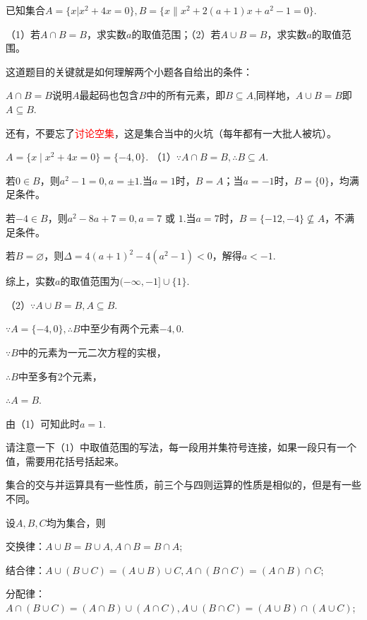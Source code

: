 \documentclass[lang=cn,math=cm,chinesefont=nofont,11pt,scheme=chinese,twocol]{elegantbook}
\begin{document}
\begin{example}
  已知集合$A=\{x|x^{2}+4x=0\},B=\{x\|x^{2}+2(a+1)x+a^{2}-1=0\}.$

  （1）若$A\cap B=B$，求实数$a$的取值范围；（2）若$A\cup B=B$，求实数$a$的取值范围。
\end{example}
\begin{remark}
  这道题目的关键就是如何理解两个小题各自给出的条件：

  $A\cap B=B$说明$A$最起码也包含$B$中的所有元素，即$B\subseteq A$,同样地，$A\cup B=B$即$A\subseteq B$.

  还有，不要忘了\textcolor{red}{讨论空集}，这是集合当中的火坑（每年都有一大批人被坑）。
\end{remark}
\begin{solution}
  $A=\{x\mid x^{2}+4x=0\}=\{-4,0\}.$
  （1）$\because A\cap B=B,$\enspace$\therefore B\subseteq A.$
  
  若$0\in B$，则$a^2-1=0,a=\pm 1.$当$a=1$时，$B=A$；当$a=-1$时，$B=\{0\}$，均满足条件。

  若$-4\in B$，则$a^2-8a+7=0,a=7\text{ 或 }1.$当$a=7$时，$B=\{-12,-4\}\nsubseteq A$，不满足条件。

  若$B=\varnothing$，则$\Delta=4(a+1)^{2}-4(a^{2}-1)<0$，解得$a<-1$.

  综上，实数$a$的取值范围为$(-\infty,-1]\cup\{1\}.$

  （2）$\because A\cup B=B,$\enspace$A\subseteq B.$

  $\because A=\{-4,0\},$\enspace$\therefore B$中至少有两个元素$-4,0.$

  $\because B$中的元素为一元二次方程的实根，

  $\therefore B$中至多有2个元素，

  $\therefore A=B.$

  由（1）可知此时$a=1$.
\end{solution}
\begin{remark}
  请注意一下（1）中取值范围的写法，每一段用并集符号连接，如果一段只有一个值，需要用花括号括起来。
\end{remark}

\hspace*{\fill}

集合的交与并运算具有一些性质，前三个与四则运算的性质是相似的，但是有一些不同。

设$A,B,C$均为集合，则
\begin{property}
  交换律：$A\cup B=B\cup A,A\cap B=B\cap A$;
\end{property}
\begin{property}
  结合律：$A\cup(B\cup C)=(A\cup B)\cup C,A\cap(B\cap C)=(A\cap B)\cap C$;
\end{property}
\begin{property}
  分配律：$A\cap(B\cup C)=(A\cap B)\cup(A\cap C),A\cup(B\cap C)=(A\cup B)\cap(A\cup C)$;
\end{property}
\end{document}
